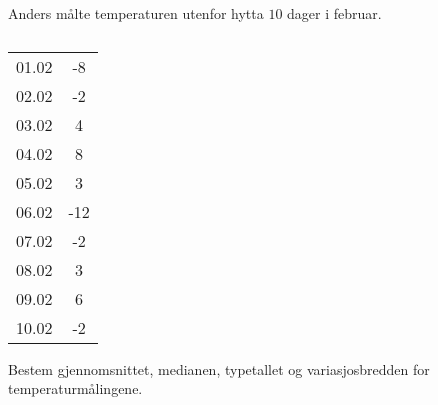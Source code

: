 %



\Oppgave[3] 

Anders målte temperaturen utenfor hytta $10$ dager i februar.

\begin{table}[H]
    \centering
    \begin{tabular}{|c |S[table-format=1.0]|}
         01.02 &  -8 \\
         02.02 &  -2 \\
         03.02 &   4 \\
         04.02 &   8 \\
         05.02 &   3 \\
         06.02 & -12 \\
         07.02 &  -2 \\
         08.02 &   3 \\
         09.02 &   6 \\
         10.02 &  -2 \\ \hline
    \end{tabular}
    \caption{}
    \label{tab:del-2-oppgave-2}
\end{table}

Bestem gjennomsnittet, medianen, typetallet og variasjosbredden for
temperaturmålingene.


